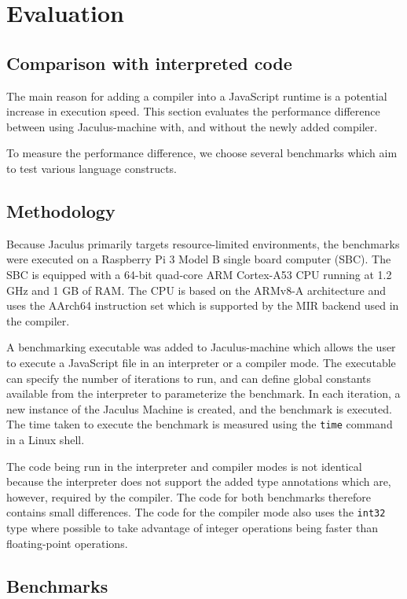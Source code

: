 \chapter{Evaluation}

\section{Comparison with interpreted code}

The main reason for adding a compiler into a JavaScript runtime is a potential increase in execution speed. This section evaluates the performance difference between using Jaculus-machine with, and without the newly added compiler.

To measure the performance difference, we choose several benchmarks which aim to test various language constructs.

\section{Methodology}

Because Jaculus primarily targets resource-limited environments, the benchmarks were executed on a Raspberry Pi 3 Model B\cite{rpi3b_product} single board computer (SBC). The SBC is equipped with a 64-bit quad-core ARM Cortex-A53 CPU running at 1.2 GHz and 1 GB of RAM. The CPU is based on the ARMv8-A architecture and uses the AArch64 instruction set which is supported by the MIR backend used in the compiler.

A benchmarking executable was added to Jaculus-machine which allows the user to execute a JavaScript file in an interpreter or a compiler mode. The executable can specify the number of iterations to run, and can define global constants available from the interpreter to parameterize the benchmark. In each iteration, a new instance of the Jaculus Machine is created, and the benchmark is executed. The time taken to execute the benchmark is measured using the \texttt{time} command in a Linux shell.

The code being run in the interpreter and compiler modes is not identical because the interpreter does not support the added type annotations which are, however, required by the compiler. The code for both benchmarks therefore contains small differences. The code for the compiler mode also uses the \texttt{int32} type where possible to take advantage of integer operations being faster than floating-point operations.


\section{Benchmarks}

